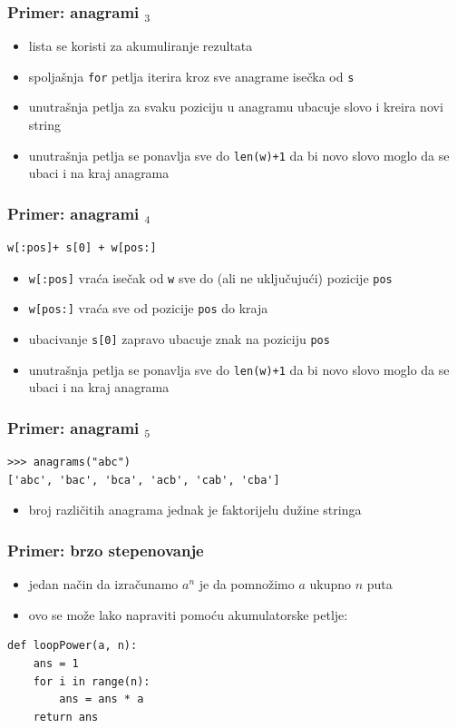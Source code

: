 \documentclass[utf8,compress]{beamer}
\begin{document}
\begin{frame}[fragile]
  \frametitle{Primer: anagrami $_3$}
  \begin{itemize}
    \item lista se koristi za akumuliranje rezultata
    \item spoljašnja \texttt{for} petlja iterira kroz sve anagrame isečka od \texttt{s}
    \item unutrašnja petlja za svaku poziciju u anagramu ubacuje slovo i kreira novi string
    \item unutrašnja petlja se ponavlja sve do \texttt{len(w)+1} da bi novo slovo moglo da se ubaci i na kraj anagrama
  \end{itemize}
\end{frame}

\begin{frame}[fragile]
  \frametitle{Primer: anagrami $_4$}
\begin{verbatim}
w[:pos]+ s[0] + w[pos:]
\end{verbatim}
  \begin{itemize}
    \item \texttt{w[:pos]} vraća isečak od \texttt{w} sve do (ali ne uključujući) pozicije \texttt{pos}
    \item \texttt{w[pos:]} vraća sve od pozicije \texttt{pos} do kraja
    \item ubacivanje \texttt{s[0]} zapravo ubacuje znak na poziciju \texttt{pos}
    \item unutrašnja petlja se ponavlja sve do \texttt{len(w)+1} da bi novo slovo moglo da se ubaci i na kraj anagrama
  \end{itemize}
\end{frame}

\begin{frame}[fragile]
  \frametitle{Primer: anagrami $_5$}
\begin{verbatim}
>>> anagrams("abc")
['abc', 'bac', 'bca', 'acb', 'cab', 'cba']
\end{verbatim}
  \begin{itemize}
    \item broj različitih anagrama jednak je faktorijelu dužine stringa
  \end{itemize}
\end{frame}

\begin{frame}[fragile]
  \frametitle{Primer: brzo stepenovanje}
  \begin{itemize}
    \item jedan način da izračunamo $a^n$ je da pomnožimo $a$ ukupno $n$ puta
    \item ovo se može lako napraviti pomoću akumulatorske petlje:
  \end{itemize}
\begin{verbatim}
def loopPower(a, n):
    ans = 1
    for i in range(n):
        ans = ans * a
    return ans
\end{verbatim}
\end{frame}
\end{document}
